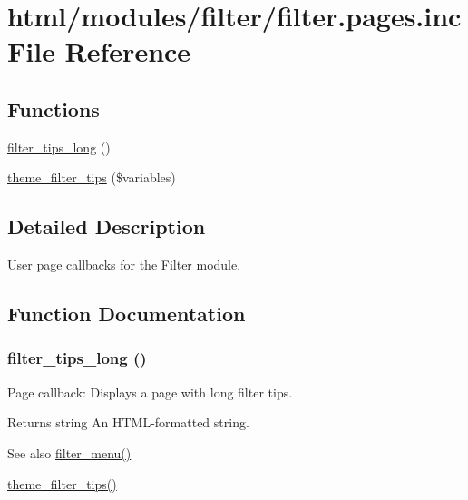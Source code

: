 \hypertarget{filter_8pages_8inc}{
\section{html/modules/filter/filter.pages.inc File Reference}
\label{filter_8pages_8inc}
}
\subsection*{Functions}
\begin{DoxyCompactItemize}
\item 
\hyperlink{filter_8pages_8inc_ae4ccdf14ccbf86544bb153048070ef03}{filter\_\-tips\_\-long} ()
\item 
\hyperlink{group__themeable_ga573322311613c1d8f1de3ff1eb8a7af8}{theme\_\-filter\_\-tips} (\$variables)
\end{DoxyCompactItemize}


\subsection{Detailed Description}
User page callbacks for the Filter module. 

\subsection{Function Documentation}
\hypertarget{filter_8pages_8inc_ae4ccdf14ccbf86544bb153048070ef03}{
\subsubsection[{filter\_\-tips\_\-long}]{\setlength{\rightskip}{0pt plus 5cm}filter\_\-tips\_\-long ()}}
\label{filter_8pages_8inc_ae4ccdf14ccbf86544bb153048070ef03}
Page callback: Displays a page with long filter tips.

\begin{DoxyReturn}{Returns}
string An HTML-\/formatted string.
\end{DoxyReturn}
\begin{DoxySeeAlso}{See also}
\hyperlink{filter_8module_a13c5612763d7d98499832594ac3d5466}{filter\_\-menu()} 

\hyperlink{group__themeable_ga573322311613c1d8f1de3ff1eb8a7af8}{theme\_\-filter\_\-tips()} 
\end{DoxySeeAlso}
